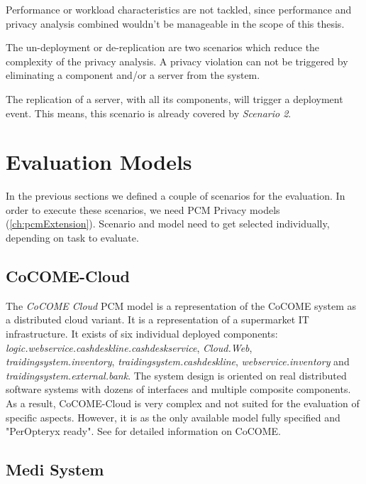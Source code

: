 Performance or workload characteristics are not tackled, since performance and privacy analysis combined wouldn't be manageable in the scope of this thesis.

The un-deployment or de-replication are two scenarios which reduce the complexity of the privacy analysis. A privacy violation can not be triggered by eliminating a component and/or a server from the system.

The replication of a server, with all its components, will trigger a deployment event. This means, this scenario is already covered by \textit{Scenario 2}.


\section{Evaluation Models}
\label{sec:Evaluation:models}

In the previous sections we defined a couple of scenarios for the evaluation. In order to execute these scenarios, we need PCM Privacy models (\autoref{ch:pcmExtension}). Scenario and model need to get selected individually, depending on task to evaluate.

\subsection{CoCOME-Cloud}
\label{sec:eval:models:cocome}

The \textit{CoCOME Cloud} PCM model is a representation of the CoCOME system as a distributed cloud variant. It is a representation of a supermarket IT infrastructure. It exists of six individual deployed components:  \textit{logic.webservice.cashdeskline.cashdeskservice}, \textit{Cloud.Web}, \textit{traidingsystem.inventory}, \textit{traidingsystem.cashdeskline}, \textit{webservice.inventory} and \textit{traidingsystem.external.bank}. The system design is oriented on real distributed software systems with dozens of interfaces and multiple composite components. As a result, CoCOME-Cloud is very complex and not suited for the evaluation of specific aspects. However, it is as the only available model fully specified and "PerOpteryx ready". See \cite{Heinrich.2015} for detailed information on CoCOME.


\subsection{Medi System}
\label{sec:eval:models:medSys}

